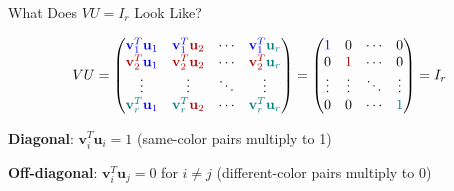 \documentclass[10pt]{beamer}
\theoremstyle{definition}
\newcommand{\x}[1]{\alert{\textbf{#1}}}
\newcommand{\bl}[1]{{\color{blue}#1}}                 %
\newcommand{\rd}[1]{{\color{red!70!black}#1}}         %
\newcommand{\tl}[1]{{\color{teal}#1}}                 %
\begin{document}
\begin{frame}{What Does $VU = I_r$ Look Like?}

$$VU = \begin{pmatrix}
\bl{\mathbf{v}_1^T}\bl{\mathbf{u}_1} & \bl{\mathbf{v}_1^T}\rd{\mathbf{u}_2} & \cdots & \bl{\mathbf{v}_1^T}\tl{\mathbf{u}_r} \\
\rd{\mathbf{v}_2^T}\bl{\mathbf{u}_1} & \rd{\mathbf{v}_2^T}\rd{\mathbf{u}_2} & \cdots & \rd{\mathbf{v}_2^T}\tl{\mathbf{u}_r} \\
\vdots & \vdots & \ddots & \vdots \\
\tl{\mathbf{v}_r^T}\bl{\mathbf{u}_1} & \tl{\mathbf{v}_r^T}\rd{\mathbf{u}_2} & \cdots & \tl{\mathbf{v}_r^T}\tl{\mathbf{u}_r}
\end{pmatrix} = \begin{pmatrix}
\bl{1} & 0 & \cdots & 0 \\
0 & \rd{1} & \cdots & 0 \\
\vdots & \vdots & \ddots & \vdots \\
0 & 0 & \cdots & \tl{1}
\end{pmatrix} = I_r$$

\vspace{0.3em}

\x{Diagonal}: $\mathbf{v}_i^T \mathbf{u}_i = 1$ \quad (same-color pairs multiply to 1)

\x{Off-diagonal}: $\mathbf{v}_i^T \mathbf{u}_j = 0$ for $i \neq j$ \quad (different-color pairs multiply to 0)

\end{frame}
\end{document}
